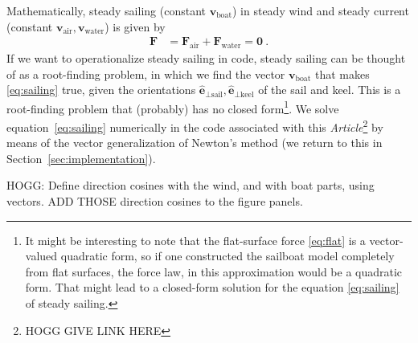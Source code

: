 \documentclass{article}
\renewcommand{\vec}[1]{\boldsymbol{#1}}
\newcommand{\uvec}{\vec{\hat{e}}}
\newcommand{\air}{\text{air}}
\newcommand{\water}{\text{water}}
\newcommand{\boat}{\text{boat}}
\newcommand{\sail}{\text{sail}}
\newcommand{\keel}{\text{keel}}
\newcommand{\vair}{\vec{v}_\air}
\newcommand{\vwater}{\vec{v}_\water}
\newcommand{\vboat}{\vec{v}_\boat}
\newcommand{\documentname}{\textsl{Article}}
\newcommand{\secref}[1]{Section~\ref{#1}}
\begin{document}
Mathematically, steady sailing (constant $\vboat$) in steady wind and steady current (constant $\vair, \vwater$) is given by
\begin{align}\label{eq:sailing}
    \vec{F} &= \vec{F}_\air + \vec{F}_\water = \vec{0} ~.
\end{align}
If we want to operationalize steady sailing in code, steady sailing can be thought of as a root-finding problem, in which we find the vector $\vboat$ that makes \eqref{eq:sailing} true, given the orientations $\uvec_{\perp\sail}, \uvec_{\perp\keel}$ of the sail and keel.
This is a root-finding problem that (probably) has no closed form\footnote{%
It might be interesting to note that the flat-surface force \eqref{eq:flat} is a vector-valued quadratic form, so if one constructed the sailboat model completely from flat surfaces, the force law, in this approximation would be a quadratic form.
That might lead to a closed-form solution for the equation \eqref{eq:sailing} of steady sailing.}.
We solve equation~\eqref{eq:sailing} numerically in the code associated with this \documentname\footnote{%
HOGG GIVE LINK HERE}
by means of the vector generalization of Newton's method (we return to this in \secref{sec:implementation}).

HOGG: Define direction cosines with the wind, and with boat parts, using vectors. ADD THOSE direction cosines to the figure panels.
\end{document}
